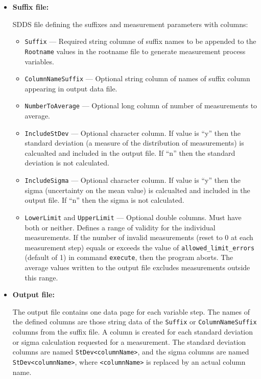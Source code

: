 \begin{itemize}
\begin{itemize}
\item {\bf Suffix file:} \par
        SDDS file defining the suffixes and measurement parameters with columns:
                \begin{itemize}
           \item {\verb+Suffix+} --- Required string columne of suffix names to be appended to the \verb+Rootname+
                         values in the rootname file to generate measurement process variables.
           \item {\verb+ColumnNameSuffix+} --- Optional string column of names of suffix column appearing in output data file.
           \item {\verb+NumberToAverage+} --- Optional long column of number of measurements to average.
           \item {\verb+IncludeStDev+} --- Optional character column. If value is 
                        ``y'' then the standard deviation (a measure of the distribution of 
                        measurements) is calcualted and included
                        in the output file. If ``n'' then the standard deviation is not calculated.
           \item {\verb+IncludeSigma+} --- Optional character column. If value is ``y'' then the sigma (uncertainty on the mean value) 
                        is calcualted and included
                        in the output file. If ``n'' then the sigma is not calculated.
           \item {\verb+LowerLimit+} and {\verb+UpperLimit+} --- Optional double columns.
                         Must have both or neither. Defines a range of validity for the
                        individual measurements. If the number of invalid measurements (reset to 0 at each
                        measurement step) equals or exceeds the value
                        of {\verb+allowed_limit_errors+} (default of 1) in command {\verb+execute+}, then the program aborts.
                        The average values written to the output file excludes measurements outside this range.
                \end{itemize}

\item {\bf Output file:}\par
The output file contains one data page for each variable step.
The names of the defined columns are those string data of the {\verb+Suffix+} or {\verb+ColumnNameSuffix+} 
columns from the suffix file.
A column is created for each standard deviation or sigma calculation requested for a measurement.
The standard deviation columns are named \verb+StDev<columnName>+, and
the sigma columns are named \verb+StDev<columnName>+, where \verb+<columnName>+ is replaced
by an actual column name.


\end{itemize}
\end{itemize}

